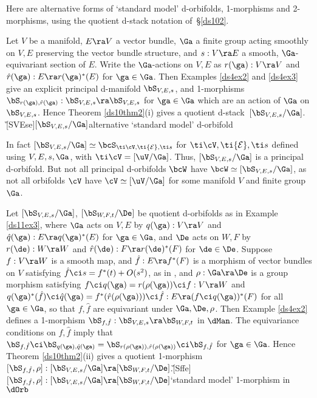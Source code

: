 \documentclass{article}
\begin{document}
Here are alternative forms of `standard model' d-orbifolds,
1-morphisms and 2-morphisms, using the quotient d-stack notation
of~\S\ref{ds102}.

\begin{ex} Let $V$ be a manifold, $E\ra V$ a vector bundle, $\Ga$ a
finite group acting smoothly on $V,E$ preserving the vector bundle
structure, and $s:V\ra E$ a smooth, $\Ga$-equivariant section of
$E$. Write the $\Ga$-actions on $V,E$ as $r(\ga):V\ra V$ and $\hat
r(\ga):E\ra r(\ga)^*(E)$ for $\ga\in\Ga$. Then Examples \ref{ds4ex2}
and \ref{ds4ex3} give an explicit principal d-manifold
$\bS_{V,E,s}$, and 1-morphisms $\bS_{\smash{r(\ga),\hat
r(\ga)}}:\bS_{V,E,s}\ra\bS_{V,E,s}$ for $\ga\in\Ga$ which are an
action of $\Ga$ on $\bS_{V,E,s}$. Hence Theorem \ref{ds10thm2}(i)
gives a quotient
d-stack~$[\bS_{V,E,s}/\Ga]$.\G[SVEse]{$[\bS_{V,E,s}/\Ga]$}{alternative
`standard model' d-orbifold}

In fact $[\bS_{V,E,s}/\Ga]\simeq\bcS_{\smash{\ti\cV,\ti{\cal E},\ti
s}}$ for $\ti\cV,\ti{\cal E},\ti s$ defined using $V,E,s,\Ga$, with
$\ti\cV=[\uV/\Ga]$. Thus, $[\bS_{V,E,s}/\Ga]$ is a principal
d-orbifold. But not all principal d-orbifolds $\bcW$ have
$\bcW\simeq[\bS_{V,E,s}/\Ga]$, as not all orbifolds $\cV$ have
$\cV\simeq[\uV/\Ga]$ for some manifold $V$ and finite group~$\Ga$.
\label{ds11ex3}
\end{ex}

\begin{ex} Let $[\bS_{V,E,s}/\Ga]$, $[\bS_{W,F,t}/\De]$ be quotient
d-orbifolds as in Example \ref{ds11ex3}, where $\Ga$ acts on $V,E$
by $q(\ga):V\ra V$ and $\hat q(\ga):E\ra q(\ga)^*(E)$ for
$\ga\in\Ga$, and $\De$ acts on $W,F$ by $r(\de):W\ra W$ and $\hat
r(\de):F\ra r(\de)^*(F)$ for $\de\in\De$. Suppose $f:V\ra W$ is a
smooth map, and $\hat f:E\ra f^*(F)$ is a morphism of vector bundles
on $V$ satisfying $\hat f\ci s= f^*(t)+O(s^2)$, as in ,
and $\rho:\Ga\ra\De$ is a group morphism satisfying $f\ci
q(\ga)=r(\rho(\ga))\ci f:V\ra W$ and $q(\ga)^*(\hat f)\ci\hat
q(\ga)=f^*(\hat r(\rho(\ga)))\ci\hat f:E\ra(f\ci q(\ga))^*(F)$ for
all $\ga\in\Ga$, so that $f,\hat f$ are equivariant under
$\Ga,\De,\rho$. Then Example \ref{ds4ex2} defines a 1-morphism
$\bS_{\smash{f,\hat f}}:\bS_{V,E,s}\ra \bS_{W,F,t}$ in $\dMan$. The
equivariance conditions on $f,\hat f$ imply that $\bS_{\smash{f,\hat
f}}\ci\bS_{\smash{q(\ga),\hat q(\ga)}}= \bS_{\smash{r(\rho(\ga)),
\hat r(\rho(\ga))}}\ci\bS_{\smash{f,\hat f}}$ for $\ga\in\Ga$. Hence
Theorem \ref{ds10thm2}(ii) gives a quotient 1-morphism~$[\bS_{
\smash{f,\hat f}},\rho]:[\bS_{V,E,s}/\Ga]\ra
[\bS_{W,F,t}/\De]$.\G[Sffe]{$[\bS_{ \smash{f,\hat
f}},\rho]:[\bS_{V,E,s}/\Ga]\ra [\bS_{W,F,t}/\De]$}{`standard model'
1-morphism in $\dOrb$}
\label{ds11ex4}
\end{ex}
\end{document}
